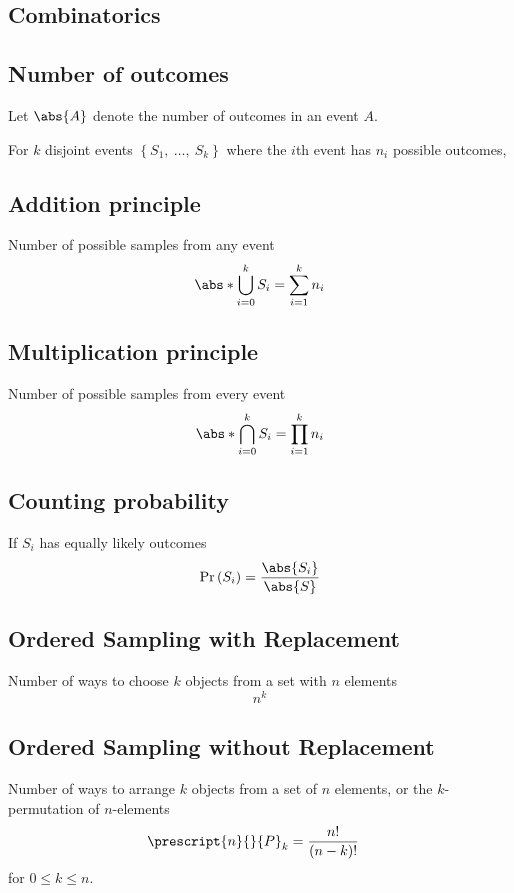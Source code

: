 \documentclass{article}
\begin{document}
\begin{multicols}{3}
    \section{Combinatorics}
    \subsection{Number of outcomes}
    Let \(\abs{A}\) denote the number of outcomes in an event \(A\).

    For \(k\) disjoint events \({\left\{ S_1,\:\ldots,\:S_k \right\}}\)
    where the \(i\)th event has \(n_i\) possible outcomes,
    \subsection{Addition principle}
    Number of possible samples from any event
    \begin{equation*}
        \abs*{\bigcup_{i = 0}^{k} S_i} = \sum_{i = 1}^k n_i
    \end{equation*}
    \subsection{Multiplication principle}
    Number of possible samples from every event
    \begin{equation*}
        \abs*{\bigcap_{i=0}^{k} S_i} = \prod_{i = 1}^k n_i
    \end{equation*}
    \subsection{Counting probability}
    If \(S_i\) has equally likely outcomes
    \begin{equation*}
        \Pr{\left( S_i \right)} = \frac{\abs{S_i}}{\abs{S}}
    \end{equation*}
    \subsection{Ordered Sampling with Replacement}
    Number of ways to choose \(k\) objects from a set with \(n\) elements
    \begin{equation*}
        n^k
    \end{equation*}
    \subsection{Ordered Sampling without Replacement}
    Number of ways to arrange \(k\) objects from a set of \(n\) elements,
    or the \(k\)-permutation of \(n\)-elements
    \begin{align*}
        \prescript{n}{}{P}_k & = \frac{n!}{\left( n - k \right)!}
    \end{align*}
    for \(0 \leq k \leq n\).


\end{multicols}
\end{document}
